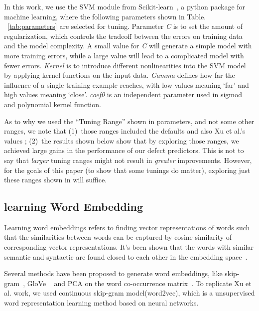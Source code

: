 In this work, we use the SVM module from Scikit-learn~\cite{scikit-learn}, a python package for machine learning,
where the following parameters shown in Table. ~\ref{tab:parameters} are selected for tuning.
Parameter {\it C} is to set the amount of regularization, which controls the tradeoff between
the errors on training data and the model complexity.  A small value for {\it C} will generate 
a simple model with more training errors, while a large value will lead to a complicated model with fewer
errors. {\it Kernel} is to introduce different nonlinearities into the SVM model by applying kernel functions
on the input data. {\it Gamma } defines how far the influence of a single training example reaches, 
with low values meaning `far' and high values meaning `close'. {\it coef0} is an independent parameter used
in sigmod and  polynomial kernel function.

As to why we used the ``Tuning Range'' shown in {parameters}, and not some other ranges,
we note that (1)~those ranges included the defaults and also Xu et al.'s values ; (2)~the results shown below
show that by exploring those ranges,   we achieved large gains in the performance of our defect predictors.
This is not to say that {\em larger} tuning ranges might not result in {\em greater} improvements.
However, for the goals of this paper (to show that some tunings do matter), exploring
just these ranges shown in  will suffice.




\subsection{learning Word Embedding}
Learning word embeddings refers to finding vector representations
of words such that the similarities between words can be captured by cosine similarity of corresponding 
vector representations. It's been shown that the words with similar semantic and syntactic are found closed
to each other in the embedding space~\cite{mikolov2013distributed}.

Several methods have been proposed to generate word embeddings, 
like skip-gram~\cite{mikolov2013distributed}, GloVe ~\cite{pennington2014glove}
and PCA on the word co-occurrence matrix~\cite{lebret2013word}. To replicate Xu et al. work,
we used continuous skip-gram model(word2vec),  which is a unsupervised word representation learning method based on
neural networks. 

